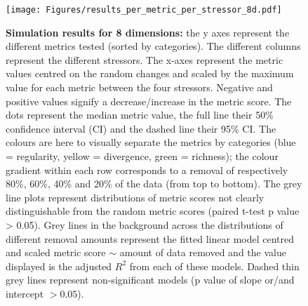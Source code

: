 \documentclass[12pt,letterpaper]{article}
\begin{document}
\begin{figure}[!htbp]
\centering
   \texttt{[image: Figures/results\_per\_metric\_per\_stressor\_8d.pdf]}
\caption{\scriptsize{\textbf{Simulation results for 8 dimensions:} the y axes represent the different metrics tested (sorted by categories).
The different columns represent the different stressors. The x-axes represent the metric values centred on the random changes and scaled by the maximum value for each metric between the four stressors.
Negative and positive values signify a decrease/increase in the metric score.
The dots represent the median metric value, the full line their 50\% confidence interval (CI) and the dashed line their 95\% CI.
The colours are here to visually separate the metrics by categories (blue = regularity, yellow = divergence, green = richness); the colour gradient within each row corresponds to a removal of respectively 80\%, 60\%, 40\% and 20\% of the data (from top to bottom).
The grey line plots represent distributions of metric scores not clearly distinguishable from the random metric scores (paired t-test p value > 0.05).
Grey lines in the background across the distributions of different removal amounts represent the fitted linear model centred and scaled metric score $\sim$ amount of data removed and the value displayed is the adjusted $R^2$ from each of these models.
Dashed thin grey lines represent non-significant models (p value of slope or/and intercept $> 0.05$).
}}
\label{Fig:simulation_results}
\end{figure}
\bigskip
\end{document}
